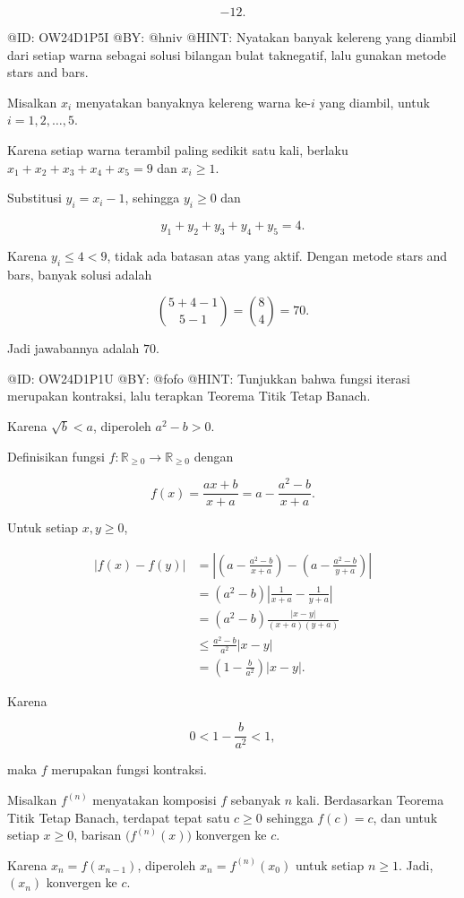 $$
\boxed{-12.}
$$

@ID: OW24D1P5I
@BY: @hniv
@HINT: Nyatakan banyak kelereng yang diambil dari setiap warna sebagai solusi bilangan bulat taknegatif, lalu gunakan metode stars and bars.

Misalkan $x_i$ menyatakan banyaknya kelereng warna ke-$i$ yang diambil, untuk $i=1,2,\ldots,5$.

Karena setiap warna terambil paling sedikit satu kali, berlaku
$x_1+x_2+x_3+x_4+x_5=9$ dan $x_i\ge1$.

Substitusi $y_i=x_i-1$, sehingga $y_i\ge0$ dan

$$
y_1+y_2+y_3+y_4+y_5=4.
$$

Karena $y_i\le4<9$, tidak ada batasan atas yang aktif. Dengan metode stars and bars, banyak solusi adalah

$$
\binom{5+4-1}{5-1}
=\binom84
=70.
$$

Jadi jawabannya adalah $\boxed{70}$.


@ID: OW24D1P1U
@BY: @fofo
@HINT: Tunjukkan bahwa fungsi iterasi merupakan kontraksi, lalu terapkan Teorema Titik Tetap Banach.

Karena $\sqrt b<a$, diperoleh $a^2-b>0$.

Definisikan fungsi $f:\mathbb R_{\ge0}\to\mathbb R_{\ge0}$ dengan

$$
f(x)=\frac{ax+b}{x+a}
=a-\frac{a^2-b}{x+a}.
$$

Untuk setiap $x,y\ge0$,

$$
\begin{aligned}
|f(x)-f(y)|
&=\left|\left(a-\frac{a^2-b}{x+a}\right)
-\left(a-\frac{a^2-b}{y+a}\right)\right|\\
&=(a^2-b)\left|\frac1{x+a}-\frac1{y+a}\right|\\
&=(a^2-b)\frac{|x-y|}{(x+a)(y+a)}\\
&\le\frac{a^2-b}{a^2}|x-y|\\
&=\left(1-\frac{b}{a^2}\right)|x-y|.
\end{aligned}
$$

Karena

$$
0<1-\frac{b}{a^2}<1,
$$

maka $f$ merupakan fungsi kontraksi.

Misalkan $f^{(n)}$ menyatakan komposisi $f$ sebanyak $n$ kali. Berdasarkan Teorema Titik Tetap Banach, terdapat tepat satu $c\ge0$ sehingga $f(c)=c$, dan untuk setiap $x\ge0$, barisan $\bigl(f^{(n)}(x)\bigr)$ konvergen ke $c$.

Karena $x_n=f(x_{n-1})$, diperoleh $x_n=f^{(n)}(x_0)$ untuk setiap $n\ge1$. Jadi, $(x_n)$ konvergen ke $c$.

